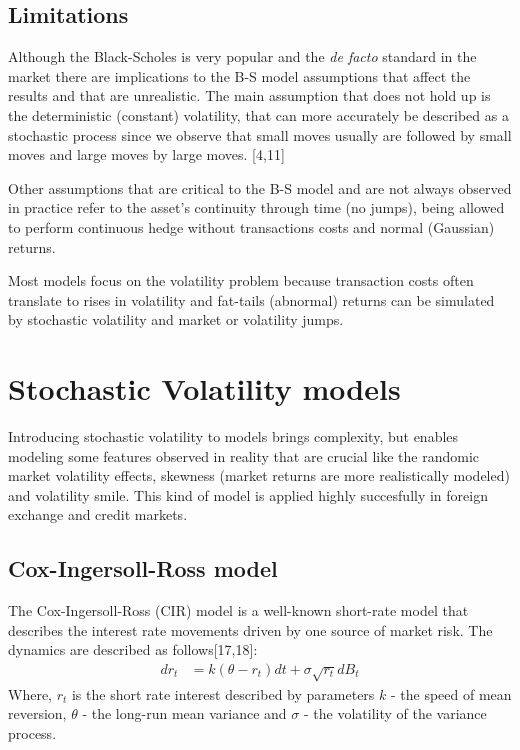 \documentclass[12pt,twoside]{reedthesis}
\theoremstyle{definition}
\theoremstyle{definition}
\theoremstyle{remark}
\begin{document}
  \subsection{Limitations}\label{limitations}
  
  Although the Black-Scholes is very popular and the \emph{de facto}
  standard in the market there are implications to the B-S model
  assumptions that affect the results and that are unrealistic. The main
  assumption that does not hold up is the deterministic (constant)
  volatility, that can more accurately be described as a stochastic
  process since we observe that small moves usually are followed by small
  moves and large moves by large moves. {[}4,11{]}
  
  Other assumptions that are critical to the B-S model and are not always
  observed in practice refer to the asset's continuity through time (no
  jumps), being allowed to perform continuous hedge without transactions
  costs and normal (Gaussian) returns.
  
  Most models focus on the volatility problem because transaction costs
  often translate to rises in volatility and fat-tails (abnormal) returns
  can be simulated by stochastic volatility and market or volatility
  jumps.
  
  \section{Stochastic Volatility
  models}\label{stochastic-volatility-models}
  
  Introducing stochastic volatility to models brings complexity, but
  enables modeling some features observed in reality that are crucial like
  the randomic market volatility effects, skewness (market returns are
  more realistically modeled) and volatility smile. This kind of model is
  applied highly succesfully in foreign exchange and credit markets.
  
  \subsection{Cox-Ingersoll-Ross model}\label{cir}
  
  The Cox-Ingersoll-Ross (CIR) model is a well-known short-rate model that
  describes the interest rate movements driven by one source of market
  risk. The dynamics are described as follows{[}17,18{]}:
  \begin{align}
  \label{eq:cir}
  dr_t &= k(\theta - r_t)dt + \sigma \sqrt{r_t} dB_t
  \end{align}
  \noindent
  Where, \(r_t\) is the short rate interest described by parameters \(k\)
  - the speed of mean reversion, \(\theta\) - the long-run mean variance
  and \(\sigma\) - the volatility of the variance process.
  
\end{document}
